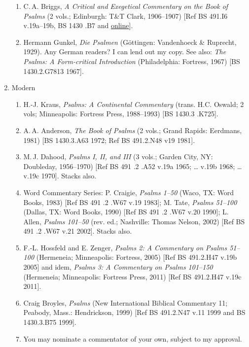 \documentclass[titlepage]{article}
\begin{document}
\begin{enumerate}
\begin{enumerate}
	\item C.\,A. Briggs, \emph{A Critical and Exegetical Commentary on the Book of Psalms} (2 vols.; Edinburgh: T\&T Clark, 1906--1907)
	[Ref BS 491.I6 v.19a–19b, BS 1430 .B7 and \href{https://archive.org/details/criticalexegetic02briguoft}{online}].

	\item Hermann Gunkel, \emph{Die Psalmen} (Göttingen: Vandenhoeck \& Ruprecht, 1929). Any German readers? I can lend out my copy. See also: \emph{The Psalms: A Form-critical Introduction} (Philadelphia: Fortress, 1967) [BS 1430.2.G7813 1967].

  \end{enumerate}
 \item Modern
  \begin{enumerate}

	\item H.-J. Kraus, \emph{Psalms: A Continental Commentary} (trans. H.C. Oswald; 2 vols; Minneapolis: Fortress Press, 1988--1993) [BS 1430.3 .K725].

	\item A.\,A. Anderson, \emph{The Book of Psalms} (2 vols.; Grand Rapids: Eerdmans, 1981) [BS 1430.3.A63 1972; Ref BS 491.2.N48 v19 1981].

	\item M.\,J. Dahood, \emph{Psalms I, II, and III} (3 vols.; Garden City, NY: Doubleday, 1956--1970) [Ref BS 491 .2 .A52 v.19a 1965; … v.19b 1968; … v.19c 1970]. Stacks also.

	\item Word Commentary Series: P. Craigie, \emph{Psalms 1--50} (Waco, TX: Word Books, 1983) [Ref BS 491 .2 .W67 v.19 1983]; M. Tate, \emph{Psalms 51--100} (Dallas, TX: Word Books, 1990) [Ref BS 491 .2 .W67 v.20 1990]; L. Allen, \emph{Psalms 101--50} (rev. ed.; Nashville: Thomas Nelson, 2002) [Ref BS 491 .2 .W67 v.21 2002]. Stacks also.

	\item F.-L. Hossfeld and E. Zenger, \emph{Psalms 2: A Commentary on Psalms 51--100} (Hermeneia; Minneapolis: Fortress, 2005) [Ref BS 491.2.H47 v.19b 2005] and idem, \emph{Psalms 3: A Commentary on Psalms 101--150} (Hermeneia; Minneapolis: Fortress Press, 2011) [Ref BS 491.2.H47 v.19c 2011].

	\item Craig Broyles, \emph{Psalms} (New International Biblical Commentary 11; Peabody, Mass.: Hendrickson, 1999) [Ref BS 491.2.N47 v.11 1999 and BS 1430.3.B75 1999].

	\item You may nominate a commentator of your own, subject to my approval.

  \end{enumerate}
\end{enumerate}
\end{document}
